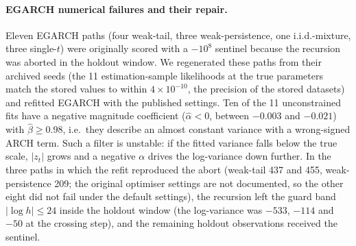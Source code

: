 \documentclass[11pt,a4paper]{article}
\theoremstyle{plain}
\theoremstyle{remark}
\begin{document}
\paragraph{EGARCH numerical failures and their repair.} Eleven EGARCH paths (four weak-tail, three weak-persistence, one i.i.d.-mixture, three single-$t$) were originally scored with a $-10^8$ sentinel because the recursion was aborted in the holdout window. We regenerated these paths from their archived seeds (the 11 estimation-sample likelihoods at the true parameters match the stored values to within $4\times10^{-10}$, the precision of the stored datasets) and refitted EGARCH with the published settings. Ten of the 11 unconstrained fits have a negative magnitude coefficient ($\hat\alpha<0$, between $-0.003$ and $-0.021$) with $\hat\beta\ge0.98$, i.e.\ they describe an almost constant variance with a wrong-signed ARCH term. Such a filter is unstable: if the fitted variance falls below the true scale, $|z_t|$ grows and a negative $\alpha$ drives the log-variance down further. In the three paths in which the refit reproduced the abort (weak-tail 437 and 455, weak-persistence 209; the original optimiser settings are not documented, so the other eight did not fail under the default settings), the recursion left the guard band $|{\log h}|\le24$ inside the holdout window (the log-variance was $-533$, $-114$ and $-50$ at the crossing step), and the remaining holdout observations received the sentinel.
\end{document}
